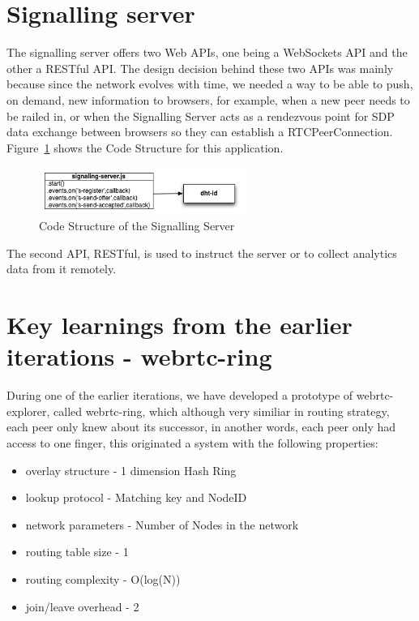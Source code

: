 \section{Signalling server}

The signalling server offers two Web APIs, one being a WebSockets API and the other a RESTful API. The design decision behind these two APIs was mainly because since the network evolves with time, we needed a way to be able to push, on demand, new information to browsers, for example, when a new peer needs to be railed in, or when the Signalling Server acts as a rendezvous point for SDP data exchange between browsers so they can establish a RTCPeerConnection. Figure~\ref{fig:d-s-s} shows the Code Structure for this application.

\begin{figure}[h!]
  \centering
  \includegraphics[width=0.6\textwidth]{figs/diagram-signalling-server}
  \caption{Code Structure of the Signalling Server}
  \label{fig:d-s-s}
\end{figure}

The second API, RESTful, is used to instruct the server or to collect analytics data from it remotely.

\section{Key learnings from the earlier iterations - webrtc-ring}

During one of the earlier iterations, we have developed a prototype of webrtc-explorer, called webrtc-ring, which although very similiar in routing strategy, each peer only knew about its successor, in another words, each peer only had access to one finger, this originated a system with the following properties:

\begin{itemize}
    \item overlay structure - 1 dimension Hash Ring
    \item lookup protocol - Matching key and NodeID
    \item network parameters - Number of Nodes in the network
    \item routing table size - 1
    \item routing complexity - O(log(N))
    \item join/leave overhead - 2
\end{itemize}

